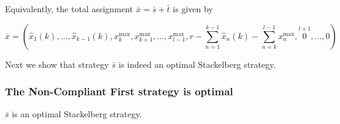 Equivalently, the total assignment $\bar{x} = \bar{s} + \bar{t}$ is given by

\[
\bar{x} = \left(
\hat{x}_1(k), \dots, \hat{x}_{k - 1}(k), 
x_{k}^{\max}, 
x_{k+1}^{\max}, \dots,  x_{l-1}^{\max}, 
r - \sum_{n = 1}^{k-1}\hat{x}_n(k) - \sum_{n = k}^{l-1}x_n^{\max}, 
\stackrel{l+1}{0}, \dots, 0 \right)
\]

Next we show that strategy $\bar{s}$ is indeed an optimal Stackelberg strategy.


\subsubsection{The Non-Compliant First strategy is optimal}

\begin{theorem}
$\bar{s}$ is an optimal Stackelberg strategy.
\end{theorem}

